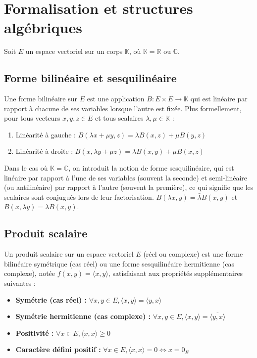 \documentclass[11pt,a4paper]{report}
\begin{document}
\section{Formalisation et structures algébriques}

Soit $E$ un espace vectoriel sur un corps $\mathbb{K}$, où $\mathbb{K} = \mathbb{R}$ ou $\mathbb{C}$.

\subsection{Forme bilinéaire et sesquilinéaire}

Une forme bilinéaire sur $E$ est une application $B : E \times E \to \mathbb{K}$ qui est linéaire par rapport à chacune de ses variables lorsque l'autre est fixée.
Plus formellement, pour tous vecteurs $x, y, z \in E$ et tous scalaires $\lambda, \mu \in \mathbb{K}$ :
\begin{enumerate}
    \item Linéarité à gauche : $B(\lambda x + \mu y, z) = \lambda B(x, z) + \mu B(y, z)$
    \item Linéarité à droite : $B(x, \lambda y + \mu z) = \lambda B(x, y) + \mu B(x, z)$
\end{enumerate}

Dans le cas où $\mathbb{K} = \mathbb{C}$, on introduit la notion de forme sesquilinéaire, qui est linéaire par rapport à l'une de ses variables (souvent la seconde) et semi-linéaire (ou antilinéaire) par rapport à l'autre (souvent la première), ce qui signifie que les scalaires sont conjugués lors de leur factorisation.
$B(\lambda x, y) = \bar{\lambda} B(x, y)$ et $B(x, \lambda y) = \lambda B(x, y)$.

\subsection{Produit scalaire}

Un produit scalaire sur un espace vectoriel $E$ (réel ou complexe) est une forme bilinéaire symétrique (cas réel) ou une forme sesquilinéaire hermitienne (cas complexe), notée $f(x,y) = \langle x, y \rangle$, satisfaisant aux propriétés supplémentaires suivantes :
\begin{itemize}
    \item \textbf{Symétrie (cas réel) :} $\forall x, y \in E, \langle x, y \rangle = \langle y, x \rangle$
    \item \textbf{Symétrie hermitienne (cas complexe) :} $\forall x, y \in E, \langle x, y \rangle = \overline{\langle y, x \rangle}$
    \item \textbf{Positivité :} $\forall x \in E, \langle x, x \rangle \ge 0$
    \item \textbf{Caractère défini positif :} $\forall x \in E, \langle x, x \rangle = 0 \iff x = 0_E$
\end{itemize}
\end{document}
